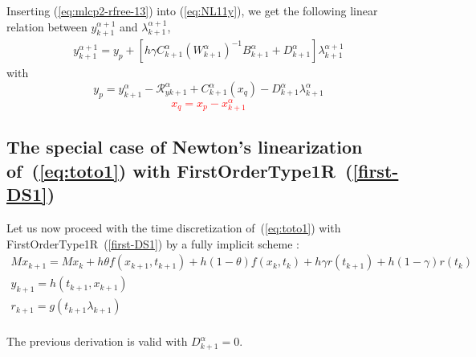 Inserting (\ref{eq:mlcp2-rfree-13}) into (\ref{eq:NL11y}), we get the following linear relation between $y^{\alpha+1}_{k+1}$ and $\lambda^{\alpha+1}_{k+1}$, 
\begin{equation}
   \begin{array}{l}
 y^{\alpha+1}_{k+1} = y_p + \left[ h \gamma C^{\alpha}_{k+1} ( W^{\alpha}_{k+1})^{-1}  B^{\alpha}_{k+1} + D^{\alpha}_{k+1} \right]\lambda^{\alpha+1}_{k+1}
   \end{array}
\end{equation}
with 
\begin{equation}\boxed{
y_p = y^{\alpha}_{k+1} -\mathcal R^{\alpha}_{yk+1} + C^{\alpha}_{k+1}(x_q) -
D^{\alpha}_{k+1} \lambda^{\alpha}_{k+1} }
\end{equation}
\textcolor{red}{
  \begin{equation}
    \boxed{ x_q= x_p - x^{\alpha}_{k+1}\label{eq:mlcp2-xqq}}
  \end{equation}
}

\subsection{The special case of Newton's linearization of~(\ref{eq:toto1}) with FirstOrderType1R~(\ref{first-DS1})} 


Let us now proceed with the time discretization of~(\ref{eq:toto1}) with FirstOrderType1R~(\ref{first-DS1})  by a fully implicit scheme : 
\begin{equation}
  \begin{array}{l}
    \label{eq:mlcp3-toto1-DS1}
     M x_{k+1} = M x_{k} +h\theta f(x_{k+1},t_{k+1})+h(1-\theta) f(x_k,t_k) + h \gamma r(t_{k+1})
     + h(1-\gamma)r(t_k)  \\[2mm]
     y_{k+1} =  h(t_{k+1},x_{k+1}) \\[2mm]
     r_{k+1} = g(t_{k+1}\lambda_{k+1})\\[2mm]
  \end{array}
\end{equation}

The previous derivation is valid with $ D^{\alpha}_{k+1} =0$.



